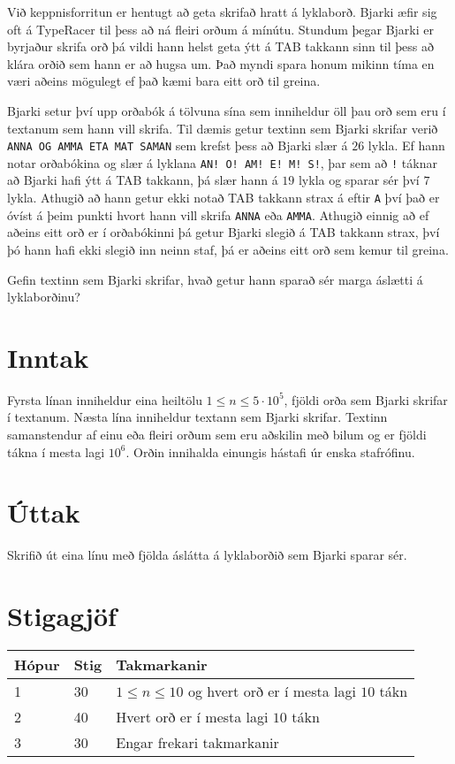 %
Við keppnisforritun er hentugt að geta skrifað hratt á lyklaborð.
Bjarki æfir sig oft á TypeRacer til þess að ná fleiri orðum á mínútu.
Stundum þegar Bjarki er byrjaður skrifa orð þá vildi hann helst geta ýtt á TAB takkann sinn til þess að klára orðið sem hann er að hugsa um.
Það myndi spara honum mikinn tíma en væri aðeins mögulegt ef það kæmi bara eitt orð til greina.

Bjarki setur því upp orðabók á tölvuna sína sem inniheldur öll þau orð sem eru í textanum sem hann vill skrifa.
Til dæmis getur textinn sem Bjarki skrifar verið \texttt{ANNA OG AMMA ETA MAT SAMAN} sem krefst þess að Bjarki slær á $26$ lykla.
Ef hann notar orðabókina og slær á lyklana
\texttt{AN! O! AM! E! M! S!}, þar sem að \texttt{!} táknar að Bjarki hafi ýtt á TAB takkann, þá slær hann á $19$ lykla og sparar sér því $7$ lykla.
Athugið að hann getur ekki notað TAB takkann strax á eftir \texttt{A} því það er óvíst á þeim punkti hvort hann vill skrifa \texttt{ANNA} eða \texttt{AMMA}.
Athugið einnig að ef aðeins eitt orð er í orðabókinni þá getur Bjarki slegið á TAB takkann strax, því þó hann hafi ekki slegið inn neinn staf, þá er aðeins eitt orð sem kemur til greina.

Gefin textinn sem Bjarki skrifar, hvað getur hann sparað sér marga áslætti á lyklaborðinu?

\section*{Inntak}
Fyrsta línan inniheldur eina heiltölu $1 \leq n \leq 5 \cdot 10^5$, fjöldi orða sem Bjarki skrifar í textanum.
Næsta lína inniheldur textann sem Bjarki skrifar.
Textinn samanstendur af einu eða fleiri orðum sem eru aðskilin með bilum og er fjöldi tákna í mesta lagi $10^6$.
Orðin innihalda einungis hástafi úr enska stafrófinu.

\section*{Úttak}
Skrifið út eina línu með fjölda áslátta á lyklaborðið sem Bjarki sparar sér.

\section*{Stigagjöf}
\begin{tabular}{|l|l|l|}
\hline
Hópur & Stig & Takmarkanir \\ \hline
1     & 30   & $1 \leq n \leq 10$ og hvert orð er í mesta lagi $10$ tákn \\ \hline
2     & 40   & Hvert orð er í mesta lagi $10$ tákn \\ \hline
3     & 30   & Engar frekari takmarkanir \\ \hline
\end{tabular}
